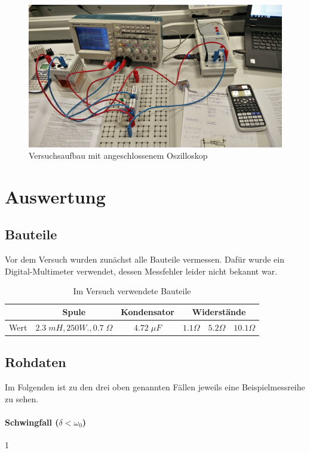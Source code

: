 \documentclass[a4paper, 11pt]{article}
\begin{document}
\begin{figure}[H]
	\centering
	\includegraphics[scale=0.1]{../IMG_20171213_164200.jpg}
	\caption{Versuchsaufbau mit angeschlossenem Oszilloskop}
	\label{fig:Aufbau}
\end{figure}


\section{Auswertung}

\subsection{Bauteile}
Vor dem Versuch wurden zunächst alle Bauteile vermessen. Dafür wurde ein Digital-Multimeter verwendet, dessen Messfehler leider nicht bekannt war.


\begin{table}[H]
	\centering
	\renewcommand{\arraystretch}{1.2}
	\begin{tabular}{|c|c|c|c|c|c|}
		\hline 
		& Spule & Kondensator & \multicolumn{3}{|c|}{Widerstände} \\
		\hline
		Wert & $2.3 \;mH, 250 W., 0.7\;\Omega$ & $4.72 \;\mu F$ & $1.1 \Omega$ & $5.2 \Omega$ & $10.1 \Omega$ \\
		\hline
	\end{tabular}
	\label{table:Bauteile}
	\caption{Im Versuch verwendete Bauteile}
\end{table}

\subsection{Rohdaten}
Im Folgenden ist zu den drei oben genannten Fällen jeweils eine Beispielmessreihe zu sehen.

\paragraph{Schwingfall ($\delta < \omega_0$)} 1
     
\end{document}
